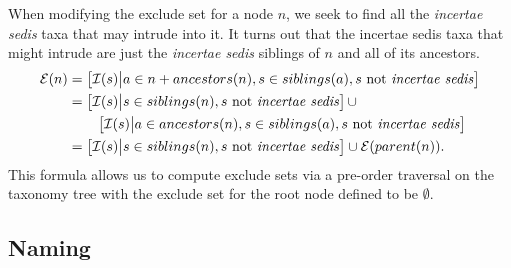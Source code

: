 \documentclass[english]{article}
\begin{document}
When modifying the exclude set for a node $n$, we seek to find all the \emph{incertae
sedis} taxa that may intrude into it. It turns out that the incertae sedis taxa that
might intrude are just the \emph{incertae sedis} siblings of $n$ and all of its ancestors.
\begin{align}
\mathcal{E}(n) & =
    \left[\mathcal{I}(s)\big|a\in n+ancestors(n),s\in siblings(a),s\text{ not \emph{incertae sedis}}\right]\nonumber\\
& =\left[\mathcal{I}(s)\big|s\in siblings(n),s\text{ not \emph{incertae sedis}}\right]\cup\nonumber\\
& \,\,\,\,\,\,\,\,\,\,\,\,\left[\mathcal{I}(s)\big|a\in ancestors(n),s\in siblings(a),s\text{ not \emph{incertae sedis}}\right]\nonumber\\
& =\left[\mathcal{I}(s)\big|s\in siblings(n),s\text{ not \emph{incertae sedis}}\right]\cup\mathcal{E}(parent(n)).\label{eq:exsetformonea}
\end{align}
This formula allows us to compute exclude sets via a pre-order traversal on the
taxonomy tree with the exclude set for the root node defined to be $\emptyset$. 


\subsection{Naming }
\end{document}
